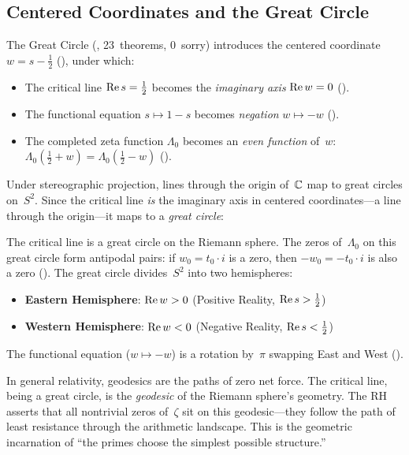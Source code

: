 \subsection{Centered Coordinates and the Great Circle}

The Great Circle (, 23~theorems, 0~sorry)
introduces the centered coordinate $w = s - \tfrac{1}{2}$ (),
under which:
\begin{itemize}
  \item The critical line $\operatorname{Re} s = \tfrac{1}{2}$ becomes the
    \emph{imaginary axis} $\operatorname{Re} w = 0$
    ().
  \item The functional equation $s \mapsto 1-s$ becomes
    \emph{negation} $w \mapsto -w$
    ().
  \item The completed zeta function $\Lambda_0$ becomes an
    \emph{even function} of~$w$:
    $\Lambda_0(\tfrac{1}{2}+w) = \Lambda_0(\tfrac{1}{2}-w)$
    ().
\end{itemize}

Under stereographic projection, lines through the origin of~$\mathbb{C}$
map to great circles on~$S^2$. Since the critical line \emph{is}
the imaginary axis in centered coordinates---a line through the
origin---it maps to a \emph{great circle}:

\begin{theorem}
\label{thm:great-circle}
The critical line is a great circle on the Riemann sphere.
The zeros of~$\Lambda_0$ on this great circle form antipodal pairs:
if $w_0 = t_0 \cdot i$ is a zero, then $-w_0 = -t_0 \cdot i$ is also
a zero ().
The great circle divides~$S^2$ into two hemispheres:
\begin{itemize}
  \item \textbf{Eastern Hemisphere}: $\operatorname{Re} w > 0$ (Positive Reality, $\operatorname{Re} s > \tfrac{1}{2}$)
  \item \textbf{Western Hemisphere}: $\operatorname{Re} w < 0$ (Negative Reality, $\operatorname{Re} s < \tfrac{1}{2}$)
\end{itemize}
The functional equation ($w \mapsto -w$) is a rotation by~$\pi$
swapping East and West ().
\end{theorem}

\begin{correspondence}
In general relativity, geodesics are the paths of zero net force.
The critical line, being a great circle, is the \emph{geodesic}
of the Riemann sphere's geometry. The RH asserts that
all nontrivial zeros of~$\zeta$ sit on this geodesic---they
follow the path of least resistance through the arithmetic
landscape. This is the geometric incarnation of ``the primes
choose the simplest possible structure.''
\end{correspondence}

